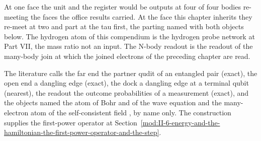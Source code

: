 At one face the unit and the register would be outputs at four of four bodies re-meeting the faces the office results carried. At the face this chapter inherits they re-meet at two and part at the tau first, the parting named with both objects below. The hydrogen atom of this compendium is the hydrogen probe network at Part VII, the mass ratio not an input. The N-body readout is the readout of the many-body join at which the joined electrons of the preceding chapter are read.
\begin{chbridge}
The literature calls the far end the partner qudit of an entangled pair (exact), the open end a dangling edge (exact), the dock a dangling edge at a terminal qubit (nearest), the readout the outcome probabilities of a measurement (exact), and the objects named the atom of Bohr and of the wave equation \cite{Bohr1913,Schrodinger1926} and the many-electron atom of the self-consistent field \cite{Hartree1928,Fock1930}, by name only. The construction supplies the first-power operator at Section~\ref{mod:II-6-energy-and-the-hamiltonian-the-first-power-operator-and-the-step}.
\end{chbridge}
